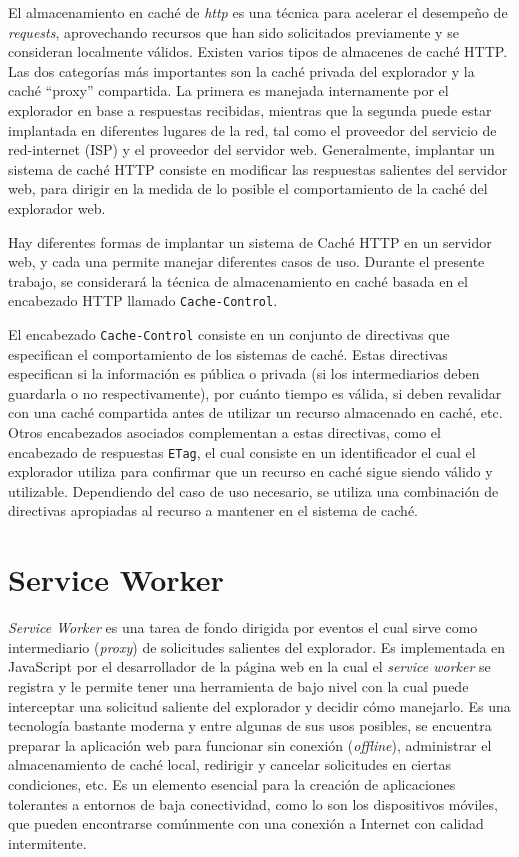 El almacenamiento en caché de \textit{http} es una técnica para acelerar el desempeño de \textit{requests}, aprovechando recursos que han sido solicitados previamente y se consideran localmente válidos. Existen varios tipos de almacenes de caché HTTP. Las dos categorías más importantes son la caché privada del explorador y la caché ``proxy'' compartida. La primera es manejada internamente por el explorador en base a respuestas recibidas, mientras que la segunda puede estar implantada en diferentes lugares de la red, tal como el proveedor del servicio de red-internet (ISP) y el proveedor del servidor web. Generalmente, implantar un sistema de caché HTTP consiste en modificar las respuestas salientes del servidor web, para dirigir en la medida de lo posible el comportamiento de la caché del explorador web.

Hay diferentes formas de implantar un sistema de Caché HTTP en un servidor web, y cada una permite manejar diferentes casos de uso. Durante el presente trabajo, se considerará la técnica de almacenamiento en caché basada en el encabezado HTTP llamado \texttt{Cache-Control}.

El encabezado \texttt{Cache-Control} consiste en un conjunto de directivas que especifican el comportamiento de los sistemas de caché. Estas directivas especifican si la información es pública o privada (si los intermediarios deben guardarla o no respectivamente), por cuánto tiempo es válida, si deben revalidar con una caché compartida antes de utilizar un recurso almacenado en caché, etc. Otros encabezados asociados complementan a estas directivas, como el encabezado de respuestas \texttt{ETag}, el cual consiste en un identificador el cual el explorador utiliza para confirmar que un recurso en caché sigue siendo válido y utilizable. Dependiendo del caso de uso necesario, se utiliza una combinación de directivas apropiadas al recurso a mantener en el sistema de caché.

\section{Service Worker}

\textit{Service Worker} es una tarea de fondo dirigida por eventos el cual sirve como intermediario (\textit{proxy}) de solicitudes salientes del explorador. Es implementada en JavaScript por el desarrollador de la página web en la cual el \textit{service worker} se registra y le permite tener una herramienta de bajo nivel con la cual puede interceptar una solicitud saliente del explorador y decidir cómo manejarlo. Es una tecnología bastante moderna y entre algunas de sus usos posibles, se encuentra preparar la aplicación web para funcionar sin conexión (\textit{offline}), administrar el almacenamiento de caché local, redirigir y cancelar solicitudes en ciertas condiciones, etc. Es un elemento esencial para la creación de aplicaciones tolerantes a entornos de baja conectividad, como lo son los dispositivos móviles, que pueden encontrarse comúnmente con una conexión a Internet con calidad intermitente.

